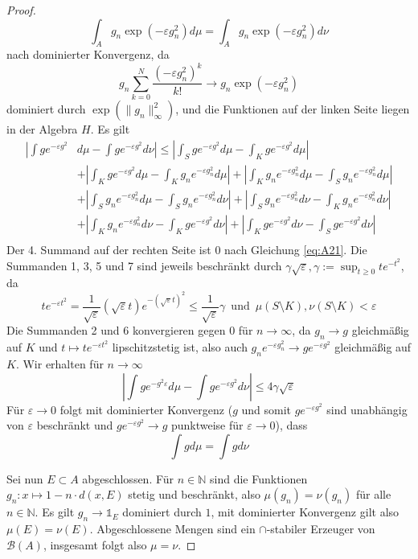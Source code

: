 \begin{proof}
    \begin{equation}\label{eq:A21}
    \int_A g_n \exp(-\varepsilon g_n^2) d\mu = \int_A g_n \exp(-\varepsilon g_n^2) d\nu
    \end{equation}
    nach dominierter Konvergenz, da 
    $$ g_n \sum_{k=0}^{N} \frac{(-\varepsilon g_n^2)^k}{k!} \rightarrow g_n \exp(-\varepsilon g_n^2)$$
    dominiert durch $\exp\left(\|g_n\|_{\infty}^2\right)$, und die Funktionen auf der linken Seite liegen in der Algebra $H$. Es gilt
    \begin{align*}
        \left| \int ge^{-\varepsilon g^2} \right.&\left.d\mu - \int ge^{-\varepsilon g^2}d\nu \right|  
        \leq \left| \int_S ge^{-\varepsilon g^2}d\mu - \int_K ge^{-\varepsilon g^2}d\mu \right| \\
        &+ \left| \int_K ge^{-\varepsilon g^2}d\mu - \int_K g_ne^{-\varepsilon g_n^2}d\mu \right| 
        + \left| \int_K g_ne^{-\varepsilon g_n^2}d\mu - \int_S g_ne^{-\varepsilon g_n^2}d\mu \right| \\
        &+ \left| \int_S g_ne^{-\varepsilon g_n^2}d\mu - \int_S g_ne^{-\varepsilon g_n^2}d\nu \right| 
        + \left| \int_S g_ne^{-\varepsilon g_n^2}d\nu - \int_K g_ne^{-\varepsilon g_n^2}d\nu \right| \\
        &+ \left| \int_K g_ne^{-\varepsilon g_n^2}d\nu - \int_K ge^{-\varepsilon g^2}d\nu \right| 
        + \left| \int_K ge^{-\varepsilon g^2}d\nu - \int_S ge^{-\varepsilon g^2}d\nu \right| \\
    \end{align*}
    Der 4. Summand auf der rechten Seite ist 0 nach Gleichung \ref{eq:A21}. Die Summanden 1, 3, 5 und 7 sind jeweils beschränkt durch $\gamma \sqrt{\varepsilon}, \gamma:=\sup_{t\geq 0}te^{-t^2}$, da 
    $$te^{-\varepsilon t^2}=\frac{1}{\sqrt{\varepsilon}}(\sqrt{\varepsilon} t)e^{-(\sqrt{\varepsilon}t)^2} \leq \frac{1}{\sqrt{\varepsilon}} \gamma \, \text{ und } \, \mu(S\setminus K), \nu(S\setminus K)<\varepsilon$$
    Die Summanden 2 und 6 konvergieren gegen $0$ für $n\rightarrow \infty$, da $g_n \rightarrow g$ gleichmäßig auf $K$ und $t \mapsto te^{-\varepsilon t^2}$ lipschitzstetig ist, also auch $g_n e^{-\varepsilon g_n^2} \rightarrow g e^{-\varepsilon g^2}$ gleichmäßig auf $K$. Wir erhalten für $n\rightarrow \infty$
    $$\left|\int ge^{-g^2\varepsilon}d\mu - \int ge^{-\varepsilon g^2} d\nu \right|\leq 4\gamma\sqrt{\varepsilon}$$
    Für $\varepsilon \rightarrow 0$ folgt mit dominierter Konvergenz ($g$ und somit $ge^{-\varepsilon g^2}$ sind unabhängig von $\varepsilon$ beschränkt und $ge^{-\varepsilon g^2} \rightarrow g$ punktweise für $\varepsilon \rightarrow 0$), dass
    $$\int gd\mu = \int gd\nu$$

    Sei nun $E \subset A$ abgeschlossen. Für $n\in \mathbb{N}$ sind die Funktionen $g_n: x \mapsto 1 - n \cdot d(x, E)$ stetig und beschränkt, also $\mu(g_n) = \nu(g_n)$ für alle $n \in \mathbb{N}$. Es gilt $g_n \rightarrow \mathds{1}_E$ dominiert durch $1$, mit dominierter Konvergenz gilt also $\mu(E)=\nu(E)$. Abgeschlossene Mengen sind ein $\cap$-stabiler Erzeuger von $\mathcal{B}(A)$, insgesamt folgt also $\mu=\nu$.
\end{proof}